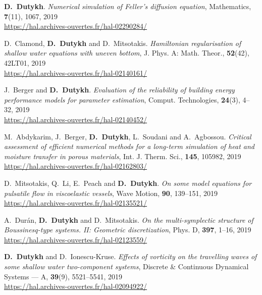 \begin{etaremune}
  \item \textbf{D.~Dutykh}. \textit{Numerical simulation of Feller's diffusion equation}, Mathematics, \textbf{7}(11), 1067, 2019 \\ %
  \url{https://hal.archives-ouvertes.fr/hal-02290284/}
  
  \item D.~Clamond, \textbf{D.~Dutykh} and D.~Mitsotakis. \textit{Hamiltonian regularisation of shallow water equations with uneven bottom}, J. Phys. A: Math. Theor., \textbf{52}(42), 42LT01, 2019 \\ %
  \url{https://hal.archives-ouvertes.fr/hal-02140161/}
  
  \item J.~Berger and \textbf{D.~Dutykh}. \textit{Evaluation of the reliability of building energy performance models for parameter estimation}, Comput. Technologies, \textbf{24}(3), 4--32, 2019 \\ %
  \url{https://hal.archives-ouvertes.fr/hal-02140452/}
  
  \item M.~Abdykarim, J.~Berger, \textbf{D.~Dutykh}, L.~Soudani and A.~Agbossou. \textit{Critical assessment of efficient numerical methods for a long-term simulation of heat and moisture transfer in porous materials}, Int. J. Therm. Sci., \textbf{145}, 105982, 2019 \\ %
  \url{https://hal.archives-ouvertes.fr/hal-02162803/}
  
  \item D.~Mitsotakis, Q.~Li, E.~Peach and \textbf{D.~Dutykh}. \textit{On some model equations for pulsatile flow in viscoelastic vessels}, Wave Motion, \textbf{90}, 139--151, 2019 \\ %
  \url{https://hal.archives-ouvertes.fr/hal-02135521/}
  
  \item A.~Dur\'{a}n, \textbf{D.~Dutykh} and D.~Mitsotakis. \textit{On the multi-symplectic structure of Boussinesq-type systems. II: Geometric discretization}, Phys. D, \textbf{397}, 1--16, 2019 \\ %
  \url{https://hal.archives-ouvertes.fr/hal-02123559/}
  
  \item \textbf{D.~Dutykh} and D.~Ionescu-Kruse. \textit{Effects of vorticity on the travelling waves of some shallow water two-component systems}, Discrete \& Continuous Dynamical Systems --- A, \textbf{39}(9), 5521--5541, 2019 \\ %
  \url{https://hal.archives-ouvertes.fr/hal-02094922/}
  

\end{etaremune}
